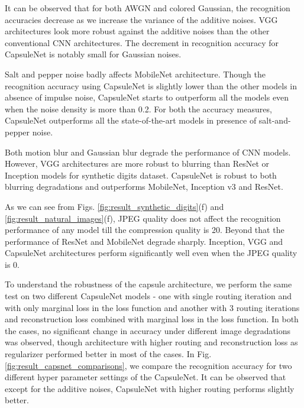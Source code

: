 \documentclass[10pt, journal, compsoc]{IEEEtran}
\begin{document}
It can be observed that for both AWGN and colored Gaussian, the recognition accuracies decrease as we increase the variance of the additive noises. VGG architectures look more robust against the additive noises than the other conventional CNN architectures. The decrement in recognition accuracy for CapsuleNet is notably small for Gaussian noises.

Salt and pepper noise badly affects MobileNet architecture. Though the recognition accuracy using CapsuleNet is slightly lower than the other models in absence of impulse noise, CapsuleNet starts to outperform all the models even when the noise density is more than 0.2. For both the accuracy measures, CapsuleNet outperforms all the state-of-the-art models in presence of salt-and-pepper noise.

Both motion blur and Gaussian blur degrade the performance of CNN models. However, VGG architectures are more robust to blurring than ResNet or Inception models for synthetic digits dataset. CapsuleNet is robust to both blurring degradations and outperforms MobileNet, Inception v3 and ResNet.

As we can see from Figs. \ref{fig:result_synthetic_digits}(f) and \ref{fig:result_natural_images}(f), JPEG quality does not affect the recognition performance of any model till the compression quality is 20. Beyond that the performance of ResNet and MobileNet degrade sharply. Inception, VGG and CapsuleNet architectures perform significantly well even when the JPEG quality is 0.

To understand the robustness of the capsule architecture, we perform the same test on two different CapsuleNet models - one with single routing iteration and with only marginal loss in the loss function and another with 3 routing iterations and reconstruction loss combined with marginal loss in the loss function. In both the cases, no significant change in accuracy under different image degradations was observed, though architecture with higher routing and reconstruction loss as regularizer performed better in most of the cases. In Fig. \ref{fig:result_capsnet_comparisons}, we compare the recognition accuracy for two different hyper parameter settings of the CapsuleNet. It can be observed that except for the additive noises, CapsuleNet with higher routing performs slightly better.
\end{document}
